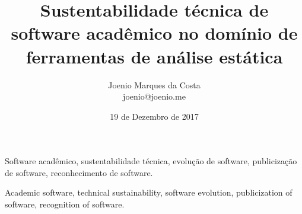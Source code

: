 \documentclass[msc, classic, a4paper]{ufbathesis}
\institute{Instituto de Matemática}
\date{19 de Dezembro de 2017}
\title{
  Sustentabilidade técnica de software acadêmico no domínio de ferramentas de
  análise estática
}
\author{Joenio Marques da Costa\\
  {\small joenio@joenio.me}
}
\begin{document}
\frontpage
\frontmatter
\presentationpage

\resumo



\begin{keywords}
Software acadêmico, sustentabilidade técnica, evolução de software, publicização de software, reconhecimento de software.
\end{keywords}

\abstract



\begin{keywords}
Academic software, technical sustainability, software evolution,
publicization of software, recognition of software.
\end{keywords}

\tableofcontents
\listoffigures
\listoftables
\mainmatter




















\backmatter




\appendix


\end{document}
